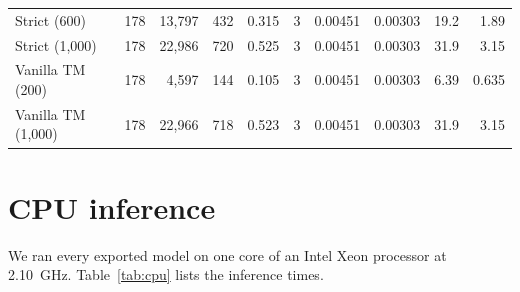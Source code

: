 \documentclass[preprint,12pt]{elsarticle}
\newcommand{\hyp}[1]{#1}
\begin{document}
\begin{table}
\begin{tabular}{lrrrrrrrrr}
Strict (600) & 178 & 13,797 & 432 & \hyp{0.315} & 3 & \hyp{0.00451} & \hyp{0.00303} & \hyp{19.2} & \hyp{1.89} \\
Strict (1,000) & 178 & 22,986 & 720 & \hyp{0.525} & 3 & \hyp{0.00451} & \hyp{0.00303} & \hyp{31.9} & \hyp{3.15} \\
Vanilla TM (200) & 178 & 4,597 & 144 & \hyp{0.105} & 3 & \hyp{0.00451} & \hyp{0.00303} & \hyp{6.39} & \hyp{0.635} \\
Vanilla TM (1,000) & 178 & 22,966 & 718 & \hyp{0.523} & 3 & \hyp{0.00451} & \hyp{0.00303} & \hyp{31.9} & \hyp{3.15} \\
\bottomrule
\end{tabular}

\end{table}

\section{CPU inference}\label{cpu}
We ran every exported model on one core of an Intel Xeon processor at 2.10~GHz. Table~\ref{tab:cpu} lists the inference times.
\end{document}
